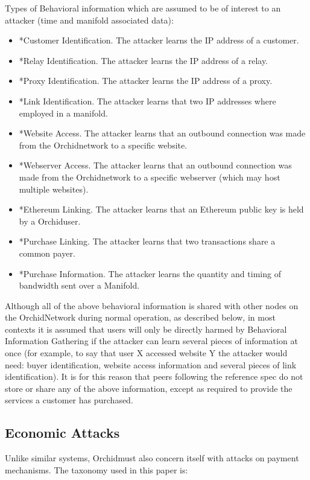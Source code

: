 \documentclass{article}
\newcommand{\orchid}{Orchid}
\newcommand{\Orchid}{\orchid}
\begin{document}
Types of Behavioral information which are assumed to be of interest to an attacker (time and manifold associated data):

\begin{itemize}
\item *Customer Identification. The attacker learns the IP address of a customer.
\item *Relay Identification. The attacker learns the IP address of a relay.
\item *Proxy Identification. The attacker learns the IP address of a proxy.
\item *Link Identification. The attacker learns that two IP addresses where employed in a manifold.
\item *Website Access. The attacker learns that an outbound connection was made from the \Orchid network to a specific website.
\item *Webserver Access. The attacker learns that an outbound connection was made from the \Orchid network to a specific webserver (which may host multiple websites).
\item *Ethereum Linking. The attacker learns that an Ethereum public key is held by a \Orchid user.
\item *Purchase Linking. The attacker learns that two transactions share a common payer.
\item *Purchase Information. The attacker learns the quantity and timing of bandwidth sent over a Manifold.
\end{itemize}

Although all of the above behavioral information is shared with other nodes on the \Orchid Network during normal operation, as described below, in most contexts it is assumed that users will only be directly harmed by Behavioral Information Gathering if the attacker can learn several pieces of information at once (for example, to say that user X accessed website Y the attacker would need: buyer identification, website access information and several pieces of link identification). It is for this reason that peers following the reference spec do not store or share any of the above information, except as required to provide the services a customer has purchased.

\subsection{Economic Attacks}
\label{econ-attacks}

Unlike similar systems, \Orchid must also concern itself with attacks on payment mechanisms. The taxonomy used in this paper is:
\end{document}
